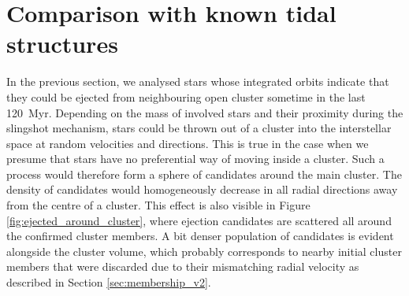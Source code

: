 \section{Comparison with known tidal structures}
\label{sec:tails_chem}
In the previous section, we analysed stars whose integrated orbits indicate that they could be ejected from neighbouring open cluster sometime in the last 120~Myr. Depending on the mass of involved stars and their proximity during the slingshot mechanism, stars could be thrown out of a cluster into the interstellar space at random velocities and directions. This is true in the case when we presume that stars have no preferential way of moving inside a cluster. Such a process would therefore form a sphere of candidates around the main cluster. The density of candidates would homogeneously decrease in all radial directions away from the centre of a cluster. This effect is also visible in Figure \ref{fig:ejected_around_cluster}, where ejection candidates are scattered all around the confirmed cluster members. A bit denser population of candidates is evident alongside the cluster volume, which probably corresponds to nearby initial cluster members that were discarded due to their mismatching radial velocity as described in Section \ref{sec:membership_v2}.

